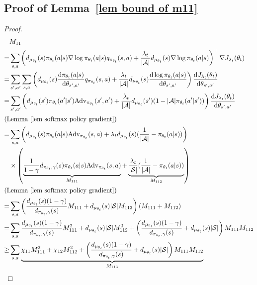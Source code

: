 \documentclass[twoside,11pt]{article}
\newcommand{\fS}{\mathcal{S}}
\newcommand{\fA}{\mathcal{A}}
\newcommand{\ns}{{|\fS|}}
\newcommand{\na}{{|\fA|}}
\newcommand{\adv}{\text{Adv}}
\numberwithin{assucounter}{section}
\begin{document}
\subsection{Proof of Lemma~\ref{lem bound of m11}}
\label{sec proof lem bound of m11}
\lemboundofmoneone*
\begin{proof}
  \begin{align}
    &M_{11} \\
    =& \sum_{s, a} \left(d_{\mu_{\theta_t}}(s) \pi_{\theta_t}(a|s) \nabla \log \pi_{\theta_t}(a|s) q_{\pi_{\theta_t}}(s, a) +  \frac{\lambda_t}{\na} d_{\mu_{\theta_t}}(s) \nabla \log \pi_{\theta_t}(a|s) \right)^\top \nabla J_{\lambda_t}(\theta_t) \\
    =& \sum_{s', a'} \sum_{s, a} \left(d_{\mu_{\theta_t}}(s) \dv{\pi_{\theta_t}(a | s)}{\theta_{s',a'}} q_{\pi_{\theta_t}}(s, a) + \frac{\lambda_t}{\na} d_{\mu_{\theta_t}}(s) \dv{\log \pi_{\theta_t} (a|s)}{\theta_{s',a'}}   \right)  \dv{J_{\lambda_t}(\theta_t)}{\theta_{s',a'}} \\
    =& \sum_{s', a'} \left( d_{\mu_{\theta_t}}(s') \pi_{\theta_t}(a'|s') \adv_{\pi_{\theta_t}}(s', a') + \frac{\lambda_t}{\na} d_{\mu_{\theta_t}}(s')  (1 -  \na\pi_{\theta_t}(a'|s')) \right) \dv{J_{\lambda_t}(\theta_t)}{\theta_{s',a'}} \\
    \intertext{\hfill (Lemma~\ref{lem softmax policy gradient})}
    =& \sum_{s, a} \left( d_{\mu_{\theta_t}}(s) \pi_{\theta_t}(a|s) \adv_{\pi_{\theta_t}}(s, a) + \lambda_t d_{\mu_{\theta_t}}(s) (\frac{1}{\na} - \pi_{\theta_t}(a|s)) \right) \\
    &\times \left(\underbrace{\frac{1}{1 - \gamma} d_{\pi_{\theta_t}, \gamma}(s) \pi_{\theta_t}(a|s) \adv_{\pi_{\theta_t}}(s, a)}_{M_{111}} + \underbrace{\frac{\lambda_t}{\ns} (\frac{1}{\na} - \pi_{\theta_t}(a | s))}_{M_{112}}\right) \\
    \intertext{\hfill (Lemma~\ref{lem softmax policy gradient})}
    =& \sum_{s, a} \left( \frac{d_{\mu_{\theta_t}}(s)(1-\gamma)}{d_{\pi_{\theta_t}, \gamma}(s)}M_{111} + d_{\mu_{\theta_t}}(s) \ns M_{112} \right)(M_{111} + M_{112}) \\
    =& \sum_{s, a} \frac{d_{\mu_{\theta_t}}(s)(1-\gamma)}{d_{\pi_{\theta_t}, \gamma}(s)}M_{111}^2 + d_{\mu_{\theta_t}}(s) \ns M_{112}^2 + \left(\frac{d_{\mu_{\theta_t}}(s)(1-\gamma)}{d_{\pi_{\theta_t}, \gamma}(s)} + d_{\mu_{\theta_t}}(s) \ns\right) M_{111}M_{112} \\
    \geq& \sum_{s, a} \underbrace{\chi_{11} M_{111}^2 +  \chi_{12} M_{112}^2 + \left(\frac{d_{\mu_{\theta_t}}(s)(1-\gamma)}{d_{\pi_{\theta_t}, \gamma}(s)} + d_{\mu_{\theta_t}}(s) \ns\right) M_{111}M_{112}}_{M_{113}} \\

\end{align}
\end{proof}
\end{document}
